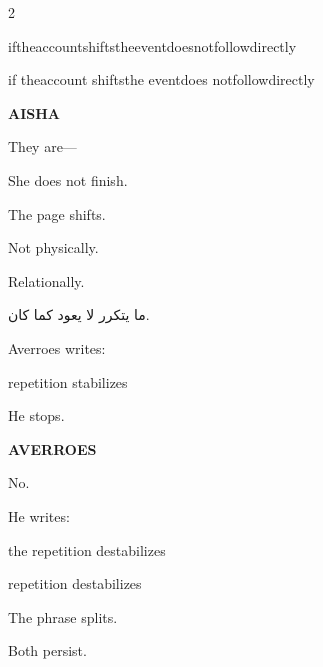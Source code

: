 \begin{paracol}{2}
\medskip

{\Clypto iftheaccountshiftstheeventdoesnotfollowdirectly}

\medskip

{\Clypto if theaccount shiftsthe eventdoes notfollowdirectly}

\medskip

\textbf{AISHA}

They are---

\medskip

She does not finish.

\medskip

\switchcolumn*


\medskip

\switchcolumn

The page shifts.

\medskip

Not physically.

\medskip

Relationally.

\medskip

\switchcolumn*

\begin{AR}
ما يتكرر لا يعود كما كان.
\end{AR}

\medskip

\switchcolumn

Averroes writes:

\medskip

 repetition stabilizes

\medskip

He stops.

\medskip

\textbf{AVERROES}

No.

\medskip

He writes:

\medskip

the repetition destabilizes

\medskip

 repetition destabilizes

\medskip

The phrase splits.

\medskip

Both persist.


\end{paracol}
